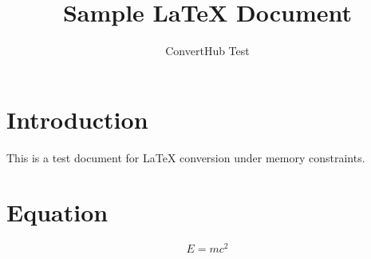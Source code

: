 \documentclass{article}
\title{Sample LaTeX Document}
\author{ConvertHub Test}
\begin{document}
\maketitle
\section{Introduction}
This is a test document for LaTeX conversion under memory constraints.
\section{Equation}
\[ E = mc^2 \]
\end{document}

